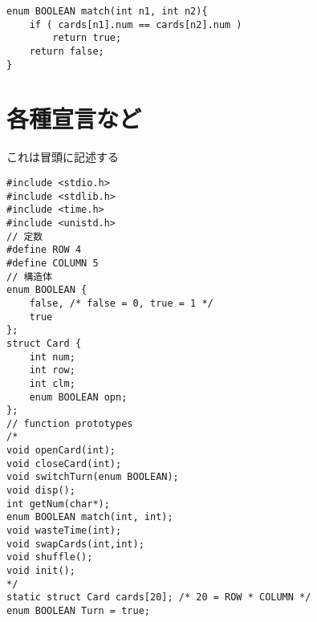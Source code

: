 \documentclass[uplatex,a4paper,11pt,oneside,openany]{jsbook}
\begin{document}
\begin{lstlisting}
enum BOOLEAN match(int n1, int n2){
    if ( cards[n1].num == cards[n2].num )
        return true;
    return false;
}
\end{lstlisting}

\begin{comment}
\section{手番の交代(switchTurn)}

\begin{lstlisting}
void switchTurn(enum BOOLEAN t){
    Turn = !t;
}
\end{lstlisting}

\section{時間稼ぎ(wasteTime)}

開いたカードを見せておく時間

\begin{lstlisting}
void wasteTime(int sec){
    sleep(sec);
}
\end{lstlisting}
\end{comment}

\section{各種宣言など}

これは冒頭に記述する

\begin{lstlisting}
#include <stdio.h>
#include <stdlib.h>
#include <time.h>
#include <unistd.h>
// 定数
#define ROW 4
#define COLUMN 5
// 構造体
enum BOOLEAN {
    false, /* false = 0, true = 1 */
    true
};
struct Card {
    int num;
    int row;
    int clm;
    enum BOOLEAN opn;
};
// function prototypes
/*
void openCard(int);
void closeCard(int);
void switchTurn(enum BOOLEAN);
void disp();
int getNum(char*);
enum BOOLEAN match(int, int);
void wasteTime(int);
void swapCards(int,int);
void shuffle();
void init();
*/
static struct Card cards[20]; /* 20 = ROW * COLUMN */
enum BOOLEAN Turn = true;  
\end{lstlisting}


%
\end{document}
